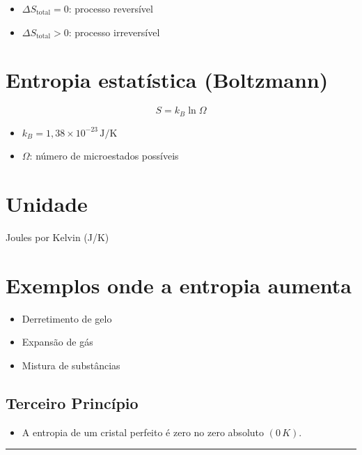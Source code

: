 \documentclass[a4paper,12pt]{article}
\begin{document}
\begin{itemize}
  \item \( \Delta S_{\text{total}} = 0 \): processo reversível
  \item \( \Delta S_{\text{total}} > 0 \): processo irreversível
\end{itemize}

\section*{Entropia estatística (Boltzmann)}

\[
S = k_B \ln \Omega
\]

\begin{itemize}
  \item \( k_B = 1{,}38 \times 10^{-23} \, \text{J/K} \)
  \item \( \Omega \): número de microestados possíveis
\end{itemize}

\section*{Unidade}
Joules por Kelvin (J/K)

\section*{Exemplos onde a entropia aumenta}
\begin{itemize}
  \item Derretimento de gelo
  \item Expansão de gás
  \item Mistura de substâncias
\end{itemize}

\subsection*{Terceiro Princípio}
\begin{itemize}
    \item A entropia de um cristal perfeito é zero no zero absoluto $(0\,K)$.
\end{itemize}

\noindent\rule{\linewidth}{0.6pt}\\
\end{document}
